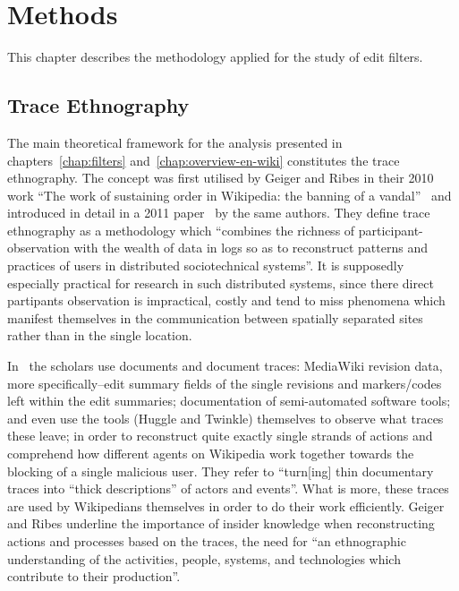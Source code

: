 \chapter{Methods}
\label{chap:methods}

This chapter describes the methodology applied for the study of edit filters.

\section{Trace Ethnography}
\label{sec:trace-ethnography}

The main theoretical framework for the analysis presented in chapters~\ref{chap:filters} and~\ref{chap:overview-en-wiki} constitutes the trace ethnography.
The concept was first utilised by Geiger and Ribes in their 2010 work ``The work of sustaining order in Wikipedia: the banning of a vandal''~\cite{GeiRib2010} and introduced in detail in a 2011 paper~\cite{GeiRib2011} by the same authors.
They define trace ethnography as a methodology which
``combines the richness of participant-observation
with the wealth of data in logs so as to reconstruct
patterns and practices of users in distributed
sociotechnical systems''.
It is supposedly especially practical for research in such distributed systems, since there direct partipants observation is impractical, costly and tend to miss phenomena which manifest themselves in the communication between spatially separated sites rather than in the single location.

In~\cite{GeiRib2011} the scholars use documents and document traces: MediaWiki revision data, more specifically–edit summary fields of the single revisions and markers/codes left within the edit summaries; documentation of semi-automated software tools; and even use the tools (Huggle and Twinkle) themselves to observe what traces these leave;
in order to reconstruct quite exactly single strands of actions and comprehend how different agents on Wikipedia work together towards the blocking of a single malicious user.
They refer to ``turn[ing] thin documentary traces into “thick descriptions” of actors and events''.
What is more, these traces are used by Wikipedians themselves in order to do their work efficiently.
Geiger and Ribes underline the importance of insider knowledge when reconstructing actions and processes based on the traces,
the need for ``an ethnographic understanding of the activities, people, systems, and technologies which contribute to their production''.

